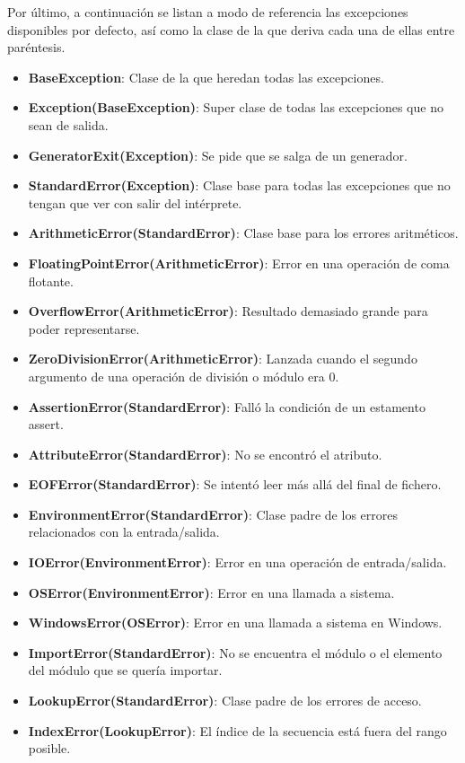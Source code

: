 \documentclass[12pt, twoside]{report}
\begin{document}
Por último, a continuación se listan a modo de referencia las excepciones disponibles por defecto, así como la clase de la que deriva cada una de ellas entre paréntesis.

\begin{itemize}
	\item \textbf{BaseException}: Clase de la que heredan todas las excepciones.
	\item \textbf{Exception(BaseException)}: Super clase de todas las excepciones que no sean de salida.
	\item \textbf{ GeneratorExit(Exception)}: Se pide que se salga de un generador.
	\item \textbf{StandardError(Exception)}: Clase base para todas las excepciones que no tengan que ver con salir del intérprete.
	\item \textbf{ArithmeticError(StandardError)}: Clase base para los errores aritméticos.
	\item \textbf{FloatingPointError(ArithmeticError)}: Error en una operación de coma flotante.
	\item \textbf{OverflowError(ArithmeticError)}: Resultado demasiado grande para poder representarse.
	\item \textbf{ZeroDivisionError(ArithmeticError)}: Lanzada cuando el segundo argumento de una operación de división o módulo era 0.
	\item \textbf{AssertionError(StandardError)}: Falló la condición de un estamento assert.
	\item \textbf{AttributeError(StandardError)}: No se encontró el atributo.
	\item \textbf{EOFError(StandardError)}: Se intentó leer más allá del final de fichero.
	\item \textbf{EnvironmentError(StandardError)}: Clase padre de los errores relacionados con la entrada/salida.
	\item \textbf{IOError(EnvironmentError)}: Error en una operación de entrada/salida.
	\item \textbf{OSError(EnvironmentError)}: Error en una llamada a sistema.
	\item \textbf{WindowsError(OSError)}: Error en una llamada a sistema en Windows.
	\item \textbf{ImportError(StandardError)}: No se encuentra el módulo o el elemento del módulo que se quería importar.
	\item \textbf{LookupError(StandardError)}: Clase padre de los errores de acceso.
	\item \textbf{IndexError(LookupError)}: El índice de la secuencia está fuera del rango posible.

\end{itemize}
\end{document}
